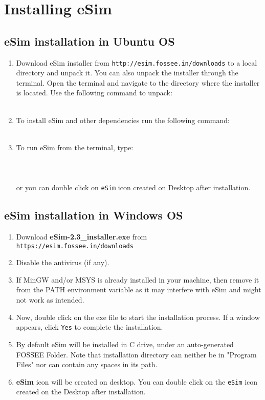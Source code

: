 \chapter{Installing eSim}
\thispagestyle{empty}
\label{chap3}

\section {eSim installation in Ubuntu OS}
\begin{enumerate}
\item Download eSim installer from {\tt http://esim.fossee.in/downloads} to a local directory and unpack it. You can also unpack the  installer through the terminal. Open the terminal and navigate to the directory where the installer is located. Use the following command to unpack: \\
\\
\item To install eSim and other dependencies run the following command: \\
\\
\item To run eSim from the terminal, type: \\ 
\\
 \\
\\
  or you can double click on {\tt eSim} icon created on Desktop after installation.
\end{enumerate}


\section {eSim installation in Windows OS}
\begin{enumerate}
\item Download \textbf{eSim-2.3\_installer.exe} from  {\tt https://esim.fossee.in/downloads}
\item Disable the antivirus (if any). 
\item If MinGW and/or MSYS is already installed in your machine, then remove it from the PATH environment variable as it may interfere with eSim and might not work as intended.
\item Now, double click on the exe file to start the installation process. If a window appears, click {\tt Yes} to complete the installation.
\item By default eSim will be installed in C drive, under an auto-generated FOSSEE Folder. Note that installation directory can neither be in "Program Files" nor can contain any spaces in its path.
\item \textbf{eSim} icon will be created on desktop. You can double click on the {\tt eSim} icon created on the Desktop after installation.
\end{enumerate}

